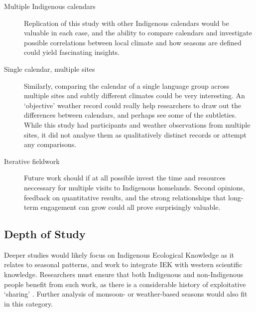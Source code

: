 \begin{description}
\item[Multiple Indigenous calendars]
    Replication of this study with other Indigenous calendars would be
    valuable in each case, and the ability to compare calendars and investigate
    possible correlations between local climate and how seasons are defined
    could yield fascinating insights.

\item[Single calendar, multiple sites]
    Similarly, comparing the calendar of a single language group across
    multiple sites and subtly different climates could be very interesting.
    An `objective' weather record could really help researchers to draw out
    the differences between calendars, and perhaps see some of the subtleties.
    While this study had participants and weather observations from multiple
    sites, it did not analyse them as qualitatively distinct records or
    attempt any comparisons.

\item[Iterative fieldwork]
    Future work should if at all possible invest the time and resources
    neccessary for multiple visits to Indigenous homelands.  Second opinions,
    feedback on quantitative results, and the strong relationships that
    long-term engagement can grow could all prove surprisingly valuable.

\end{description}


\subsection{Depth of Study}
Deeper studies would likely focus on Indigenous Ecological Knowledge as it
relates to seasonal patterns, and work to integrate IEK with western scientific
knowledge.  Researchers must ensure that both Indigenous and non-Indigenous
people benefit from such work, as there is a considerable history of
exploitative `sharing' \citep[eg.][]{smith1999}.  Further analysis of monsoon-
or weather-based seasons would also fit in this category.

